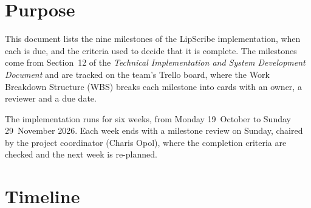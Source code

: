 \documentclass[11pt,a4paper]{article}
\begin{document}

\section{Purpose}
This document lists the nine milestones of the LipScribe implementation, when
each is due, and the criteria used to decide that it is complete. The
milestones come from Section~12 of the \emph{Technical Implementation and
System Development Document} and are tracked on the team's Trello board, where
the Work Breakdown Structure (WBS) breaks each milestone into cards with an
owner, a reviewer and a due date.

The implementation runs for six weeks, from Monday 19~October to
Sunday 29~November 2026. Each week ends with a milestone review on Sunday,
chaired by the project coordinator (Charis Opol), where the completion criteria
are checked and the next week is re-planned.

\section{Timeline}
\end{document}
